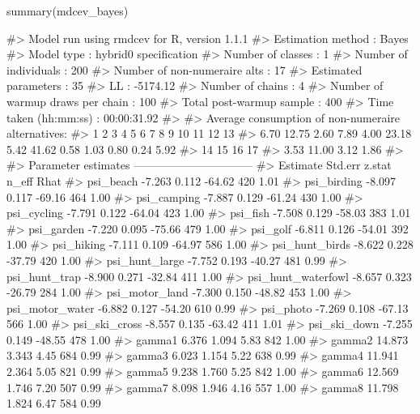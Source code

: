 \begin{Schunk}
\begin{Sinput}
    summary(mdcev_bayes)
\end{Sinput}
\begin{Soutput}
#> Model run using rmdcev for R, version 1.1.1 
#> Estimation method                : Bayes
#> Model type                       : hybrid0 specification
#> Number of classes                : 1
#> Number of individuals            : 200
#> Number of non-numeraire alts     : 17
#> Estimated parameters             : 35
#> LL                               : -5174.12
#> Number of chains                 : 4
#> Number of warmup draws per chain : 100
#> Total post-warmup sample         : 400
#> Time taken (hh:mm:ss)            : 00:00:31.92
#> 
#> Average consumption of non-numeraire alternatives:
#>     1     2     3     4     5     6     7     8     9    10    11    12    13 
#>  6.70 12.75  2.60  7.89  4.00 23.18  5.42 41.62  0.58  1.03  0.80  0.24  5.92 
#>    14    15    16    17 
#>  3.53 11.00  3.12  1.86 
#> 
#> Parameter estimates --------------------------------  
#>                    Estimate Std.err z.stat n_eff Rhat
#> psi_beach            -7.263   0.112 -64.62   420 1.01
#> psi_birding          -8.097   0.117 -69.16   464 1.00
#> psi_camping          -7.887   0.129 -61.24   430 1.00
#> psi_cycling          -7.791   0.122 -64.04   423 1.00
#> psi_fish             -7.508   0.129 -58.03   383 1.01
#> psi_garden           -7.220   0.095 -75.66   479 1.00
#> psi_golf             -6.811   0.126 -54.01   392 1.00
#> psi_hiking           -7.111   0.109 -64.97   586 1.00
#> psi_hunt_birds       -8.622   0.228 -37.79   420 1.00
#> psi_hunt_large       -7.752   0.193 -40.27   481 0.99
#> psi_hunt_trap        -8.900   0.271 -32.84   411 1.00
#> psi_hunt_waterfowl   -8.657   0.323 -26.79   284 1.00
#> psi_motor_land       -7.300   0.150 -48.82   453 1.00
#> psi_motor_water      -6.882   0.127 -54.20   610 0.99
#> psi_photo            -7.269   0.108 -67.13   566 1.00
#> psi_ski_cross        -8.557   0.135 -63.42   411 1.01
#> psi_ski_down         -7.255   0.149 -48.55   478 1.00
#> gamma1                6.376   1.094   5.83   842 1.00
#> gamma2               14.873   3.343   4.45   684 0.99
#> gamma3                6.023   1.154   5.22   638 0.99
#> gamma4               11.941   2.364   5.05   821 0.99
#> gamma5                9.238   1.760   5.25   842 1.00
#> gamma6               12.569   1.746   7.20   507 0.99
#> gamma7                8.098   1.946   4.16   557 1.00
#> gamma8               11.798   1.824   6.47   584 0.99

\end{Soutput}
\end{Schunk}
